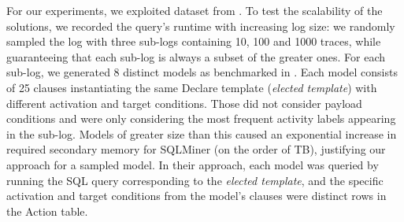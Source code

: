 For our experiments, we exploited   dataset from \cite{SchonigRCJM16}. To test the scalability of the solutions, we recorded the query's runtime with increasing log size: we randomly sampled the log with three sub-logs containing 10, 100 and 1000 traces, while guaranteeing that each sub-log is always a subset of the greater ones. For each sub-log, we generated 8 distinct models as benchmarked in \cite{Schonig15}. Each model consists of 25 clauses instantiating the same Declare template (\textit{elected template}) with different activation and target conditions. Those did not consider payload conditions and were only considering the most frequent activity labels appearing in the sub-log. Models of greater size than this caused an exponential increase in required secondary memory for SQLMiner (on the order of TB), justifying our approach for a sampled model. In their approach, each model was queried by running the SQL query corresponding to the \textit{elected template}, and the specific activation and target conditions from the model's clauses were distinct rows in the \textsf{Action} table.



